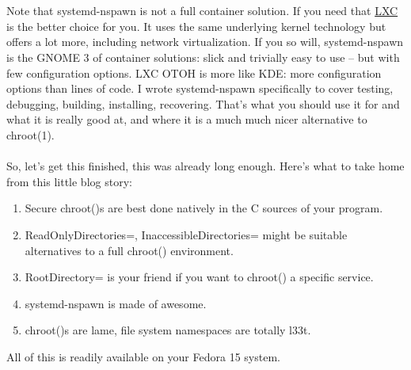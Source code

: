 \documentclass[titlepage]{article}
\begin{document}
\\
\\
Note that systemd-nspawn is not a full container solution. If you need that \href{http://lxc.sourceforge.net/}{LXC} is the better choice for you. It uses the same underlying kernel technology but offers a lot more, including network virtualization. If you so will, systemd-nspawn is the GNOME 3 of container solutions: slick and trivially easy to use -- but with few configuration options. LXC OTOH is more like KDE: more configuration options than lines of code. I wrote systemd-nspawn specifically to cover testing, debugging, building, installing, recovering. That's what you should use it for and what it is really good at, and where it is a much much nicer alternative to chroot(1).
\\
\\
So, let's get this finished, this was already long enough. Here's what to take home from this little blog story:
\begin{enumerate}
\item
Secure chroot()s are best done natively in the C sources of your program.
\item
ReadOnlyDirectories=, InaccessibleDirectories= might be suitable alternatives to a full chroot() environment.
\item
RootDirectory= is your friend if you want to chroot() a specific service.
\item
systemd-nspawn is made of awesome.
\item
chroot()s are lame, file system namespaces are totally l33t.
\end{enumerate}
All of this is readily available on your Fedora 15 system.
\end{document}
